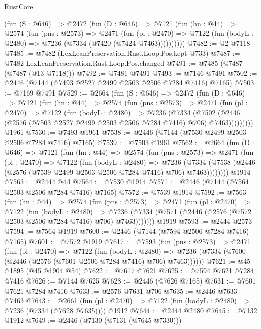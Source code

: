 \begin{lexlean}{RustCore}
\begin{coremodule}
      (fun (S : @646) =>
      @2472
        (fun (D : @646) =>
        @7121
          (fun (hn : @44) =>
          @2574
            (fun (pns : @2573) =>
            @2471
              (fun (pl : @2470) =>
              @7122 (fun (bodyL : @2480) => @7236 (@7334 (@7420 (@7424 @7463))))))))))
@7482 := @2 @7118
@7485 := @7482 (LexLeanPreservation.Rust.Loop.Pos.kept @733)
@7487 := @7482 LexLeanPreservation.Rust.Loop.Pos.changed
@7491 := @7485 (@7487 (@7487 (@13 @7118)))
@7492 := @7481 @7491
@7493 := @7146 @7491
@7502 := @2446 (@7144 (@7493 @2527 @2499 @2503 @2506 @7284 @7416) @7165)
@7503 := @7169 @7491
@7529 := @2664
    (fun (S : @646) =>
    @2472
      (fun (D : @646) =>
      @7121
        (fun (hn : @44) =>
        @2574
          (fun (pns : @2573) =>
          @2471
            (fun (pl : @2470) =>
            @7122
              (fun (bodyL : @2480) =>
              @7236
                (@7334
                  (@7502
                    (@2446 (@2576 (@7503 @2527 @2499 @2503 @2506 @7284 @7416) @706) @7463)))))))))
    @1961
@7530 := @7493 @1961
@7538 := @2446 (@7144 (@7530 @2499 @2503 @2506 @7284 @7416) @7165)
@7539 := @7503 @1961
@7562 := @2664
    (fun (D : @646) =>
    @7121
      (fun (hn : @44) =>
      @2574
        (fun (pns : @2573) =>
        @2471
          (fun (pl : @2470) =>
          @7122
            (fun (bodyL : @2480) =>
            @7236
              (@7334 (@7538 (@2446 (@2576 (@7539 @2499 @2503 @2506 @7284 @7416) @706) @7463))))))))
    @1914
@7563 := @2444 @44
@7564 := @7530 @1914
@7571 := @2446 (@7144 (@7564 @2503 @2506 @7284 @7416) @7165)
@7572 := @7539 @1914
@7592 := @7563
    (fun (hn : @44) =>
    @2574
      (fun (pns : @2573) =>
      @2471
        (fun (pl : @2470) =>
        @7122
          (fun (bodyL : @2480) =>
          @7236 (@7334 (@7571 (@2446 (@2576 (@7572 @2503 @2506 @7284 @7416) @706) @7463)))))))
    @1919
@7593 := @2444 @2573
@7594 := @7564 @1919
@7600 := @2446 (@7144 (@7594 @2506 @7284 @7416) @7165)
@7601 := @7572 @1919
@7617 := @7593
    (fun (pns : @2573) =>
    @2471
      (fun (pl : @2470) =>
      @7122
        (fun (bodyL : @2480) =>
        @7236 (@7334 (@7600 (@2446 (@2576 (@7601 @2506 @7284 @7416) @706) @7463))))))
@7621 := @45 @1895 (@45 @1904 @54)
@7622 := @7617 @7621
@7625 := @7594 @7621 @7284 @7416
@7626 := @7144 @7625
@7628 := @2446 (@7626 @7165)
@7631 := @7601 @7621 @7284 @7416
@7633 := @2576 @7631 @706
@7635 := @2446 @7633 @7463
@7643 := @2661
    (fun (pl : @2470) => @7122 (fun (bodyL : @2480) => @7236 (@7334 (@7628 @7635))))
    @1912
@7644 := @2444 @2480
@7645 := @7132 @1912
@7649 := @2446 (@7130 (@7131 (@7645 @7330)))

\end{coremodule}
\end{lexlean}
